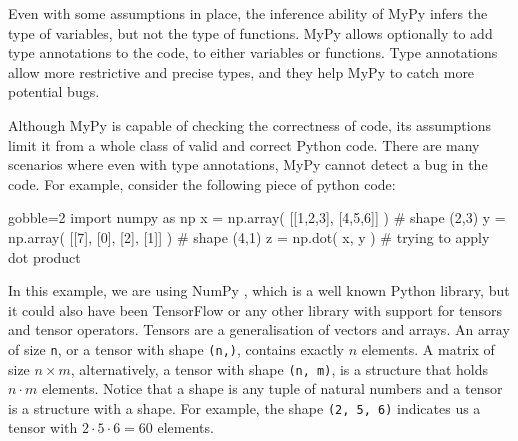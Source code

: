 
Even with some assumptions in place, the inference ability of MyPy infers the type of
variables, but not the type of functions. MyPy allows optionally to add type annotations
to the code, to either variables or functions. Type annotations allow more restrictive and
precise types, and they help MyPy to catch more potential bugs.

Although MyPy is capable of checking the correctness of code, its assumptions limit it from a whole class of valid and correct
Python code\footnotemark. There are many scenarios where even with type annotations, MyPy
cannot detect a bug in the code. For example, consider the following piece of python
code:%



\begin{pythoncode*}{gobble=2}
  import numpy as np
  x = np.array( [[1,2,3], [4,5,6]] ) # shape (2,3)
  y = np.array( [[7], [0], [2], [1]] ) # shape (4,1)
  z = np.dot( x, y ) # trying to apply dot product
\end{pythoncode*}

In this example, we are using NumPy \autocite{oliphant2006guide}, which is a well known
Python library, but it could also have been TensorFlow \autocite{abadi_tensorflow_2016} or
any other library with support for tensors and tensor operators. Tensors are a
generalisation of vectors and arrays.  An array of size \texttt{n}, or a tensor with shape
\texttt{(n,)}, contains exactly \(n\) elements. A matrix of size \(n \times m\),
alternatively, a tensor with shape \texttt{(n,\ m)}, is a structure that holds
\(n \cdot m\) elements. Notice that a shape is any tuple of natural numbers and a tensor is
a structure with a shape. For example, the shape \texttt{(2,\ 5,\ 6)} indicates us a
tensor with \(2 \cdot 5 \cdot 6 = 60\) elements.

